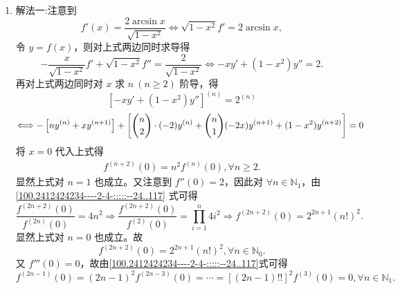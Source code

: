 \documentclass[../../main.tex]{subfiles}%
\begin{document}
\begin{solution}
\begin{enumerate}[(1)]
\item {\color{blue}解法一:}注意到
\[
f'(x) = \frac{2\arcsin x}{\sqrt{1 - x^2}} \Longleftrightarrow \sqrt{1 - x^2} f' = 2\arcsin x,
\]
令 \( y = f(x) \)，则对上式两边同时求导得
\[
-\frac{x}{\sqrt{1 - x^2}} f' + \sqrt{1 - x^2} f'' = \frac{2}{\sqrt{1 - x^2}} \Longleftrightarrow -x y' + (1 - x^2) y'' = 2.
\]
再对上式两边同时对 \( x \) 求 \( n \ (n \geqslant 2) \) 阶导，得
\[
\left[ -x y' + (1 - x^2) y'' \right]^{(n)} = 2^{(n)}
\]
\[
\Longleftrightarrow -\left[ n y^{(n)} + x y^{(n + 1)} \right] + \left[ \dbinom{n}{2} \cdot (-2) y^{(n)} + \dbinom{n}{1} (-2x) y^{(n + 1)} + (1 - x^2) y^{(n + 2)} \right] = 0
\]
将 \( x = 0 \) 代入上式得
\begin{align}\label{100.2412424234----2-4-:::::--24..117}
f^{(n + 2)}(0) = n^2 f^{(n)}(0), \forall n \geqslant 2. 
\end{align}
显然上式对 \( n = 1 \) 也成立。又注意到 \( f''(0) = 2 \)，因此对 \( \forall n \in \mathbb{N}_1 \)，由\eqref{100.2412424234----2-4-:::::--24..117} 式可得
\[
\frac{f^{(2n + 2)}(0)}{f^{(2n)}(0)} = 4n^2 \Rightarrow \frac{f^{(2n + 2)}(0)}{f^{(2)}(0)} = \prod_{i = 1}^n 4i^2 \Rightarrow f^{(2n + 2)}(0) = 2^{2n + 1} (n!)^2.
\]
显然上式对 \( n = 0 \) 也成立。故
\[
f^{(2n + 2)}(0) = 2^{2n + 1} (n!)^2, \forall n \in \mathbb{N}_0.
\]
又 \( f'''(0) = 0 \)，故由\eqref{100.2412424234----2-4-:::::--24..117}式可得
\[
f^{(2n - 1)}(0) = (2n - 1)^2 f^{(2n - 3)}(0) = \cdots = \left[ (2n - 1)!! \right]^2 f^{(3)}(0) = 0, \forall n \in \mathbb{N}_1.
\]


\end{enumerate}
\end{solution}
\end{document}
